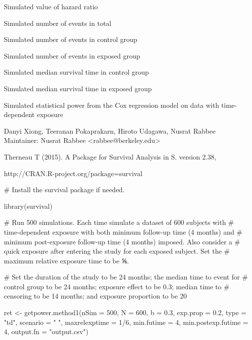 \documentclass[a4paper]{book}
\begin{document}
\begin{Value}
\begin{ldescription}
\item[\code{HR}] 
Simulated value of hazard ratio

\item[\code{d}] 
Simulated number of events in total

\item[\code{d\_c}] 
Simulated number of events in control group

\item[\code{d\_exp}] 
Simulated number of events in exposed group

\item[\code{mst\_c}] 
Simulated median survival time in control group

\item[\code{mst\_exp}] 
Simulated median survival time in exposed group

\item[\code{pow}] 
Simulated statistical power from the Cox regression model on data with
time-dependent exposure

\end{ldescription}
\end{Value}
%
\begin{Author}\relax
Danyi Xiong, Teeranan Pokaprakarn, Hiroto Udagawa, Nusrat Rabbee \\{}
Maintainer: Nusrat Rabbee <rabbee@berkeley.edu>
\end{Author}
%
\begin{References}\relax

Therneau T (2015). A Package for Survival Analysis in S. version 2.38,

http://CRAN.R-project.org/package=survival
\end{References}
%
\begin{Examples}
\begin{ExampleCode}
# Install the survival package if needed.

library(survival)

# Run 500 simulations. Each time simulate a dataset of 600 subjects with
# time-dependent exposure with both minimum follow-up time (4 months) and
# minimum post-exposure follow-up time (4 months) imposed. Also consider a
# quick exposure after entering the study for each exposed subject. Set the
# maximum relative exposure time to be ⅙. 

# Set the duration of the study to be 24 months; the median time to event for
# control group to be 24 months; exposure effect to be 0.3; median time to
# censoring to be 14 months; and exposure proportion to be 20%

ret <- getpower.method1(nSim = 500, N = 600, b = 0.3, exp.prop = 0.2,
    type = "td", scenario = " ", maxrelexptime = 1/6, min.futime = 4,
    min.postexp.futime = 4, output.fn = "output.csv")



\end{ExampleCode}
\end{Examples}
\end{document}
